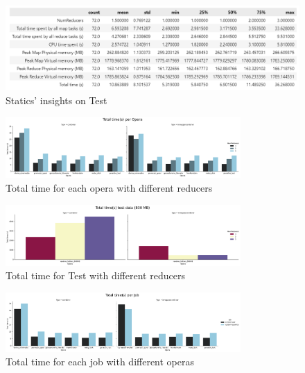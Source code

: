 \begin{figure}[H]
  \centering
  \includegraphics[width=\textwidth]{media/performance/opera_df_describe.png}
  \caption{Statics' insights on Test}
  \label{fig:OperaInsightsTEST}
\end{figure}


\begin{figure}[H]
  \centering
  \includegraphics[width=0.8\textwidth]{media/performance/total_time_S_per_opera.png}
  \caption{Total time for each opera with different reducers}
  \label{fig:TimeOperas}
\end{figure}

\begin{figure}[H]
  \centering
  \includegraphics[width=0.8\textwidth]{media/performance/total_time_S_per_opera(TEST).png}
  \caption{Total time for Test with different reducers}
  \label{fig:TimeTest}
\end{figure}

\begin{figure}[H]
  \centering
  \includegraphics[width=0.8\textwidth]{media/performance/total_time_S_per_job.png}
  \caption{Total time for each job with different operas}
  \label{fig:TimeJob}
\end{figure}

